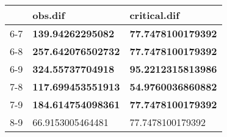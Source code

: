 \begin{table}[ht]
\centering
\begin{tabular}{rll}
  \hline
 & obs.dif & critical.dif \\ 
  \hline
6-7 & \textbf{139.94262295082} & \textbf{77.7478100179392} \\ 
  6-8 & \textbf{257.642076502732} & \textbf{77.7478100179392} \\ 
  6-9 & \textbf{324.55737704918} & \textbf{95.2212315813986} \\ 
  7-8 & \textbf{117.699453551913} & \textbf{54.9760036860882} \\ 
  7-9 & \textbf{184.614754098361} & \textbf{77.7478100179392} \\ 
  8-9 & 66.9153005464481 & 77.7478100179392 \\ 
   \hline
\end{tabular}
\end{table}
